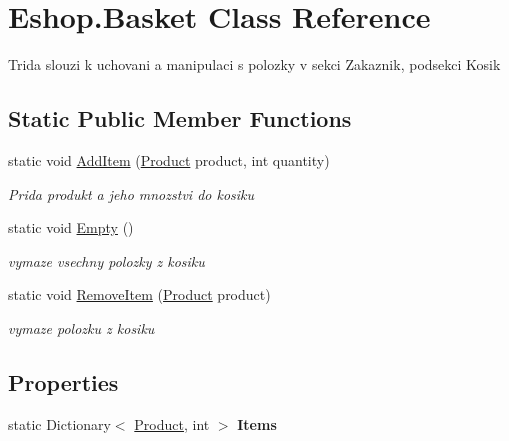 \hypertarget{class_eshop_1_1_basket}{}\section{Eshop.\+Basket Class Reference}
\label{class_eshop_1_1_basket}


Trida slouzi k uchovani a manipulaci s polozky v sekci Zakaznik, podsekci Kosik  


\subsection*{Static Public Member Functions}
\begin{DoxyCompactItemize}
\item 
static void \mbox{\hyperlink{class_eshop_1_1_basket_ae448262dd74f9291cec930964e9a3341}{Add\+Item}} (\mbox{\hyperlink{class_eshop_1_1_product}{Product}} product, int quantity)
\begin{DoxyCompactList}\small\item\em Prida produkt a jeho mnozstvi do kosiku \end{DoxyCompactList}\item 
static void \mbox{\hyperlink{class_eshop_1_1_basket_ab239f0bfeb6845c0f8ee3eab9d5e5fc8}{Empty}} ()
\begin{DoxyCompactList}\small\item\em vymaze vsechny polozky z kosiku \end{DoxyCompactList}\item 
static void \mbox{\hyperlink{class_eshop_1_1_basket_aed39381bc57925fbb68a5dd7c27cb177}{Remove\+Item}} (\mbox{\hyperlink{class_eshop_1_1_product}{Product}} product)
\begin{DoxyCompactList}\small\item\em vymaze polozku z kosiku \end{DoxyCompactList}\end{DoxyCompactItemize}
\subsection*{Properties}
\begin{DoxyCompactItemize}
\item 
\mbox{\label{class_eshop_1_1_basket_a4df1138d4aa0efcc64203feb8eec609b}} 
static Dictionary$<$ \mbox{\hyperlink{class_eshop_1_1_product}{Product}}, int $>$ {\bfseries Items}
\end{DoxyCompactItemize}


